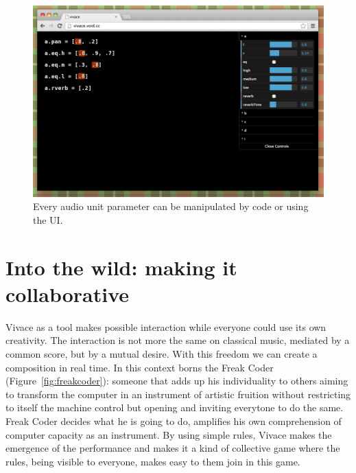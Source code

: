 \documentclass[letterpaper, 12pt]{article}
\begin{document}
\begin{figure}[htpb]
  \begin{center}
    \includegraphics[scale=.3]{img/fig_ui.png}
    \caption{Every audio unit parameter can be manipulated by code or
      using the UI.}
    \label{fig:ui}
  \end{center}
\end{figure}

\section{Into the wild: making it collaborative}
\label{freakcoding}

Vivace as a tool makes possible interaction while everyone could use
its own creativity. The interaction is not more the same on classical
music, mediated by a common score, but by a mutual desire. With this
freedom we can create a composition in real time. In this context
borns the Freak Coder (Figure~\ref{fig:freakcoder}): someone that adds
up his individuality to others aiming to transform the computer in an
instrument of artistic fruition without restricting to itself the
machine control but opening and inviting everytone to do the
same. Freak Coder decides what he is going to do, amplifies his own
comprehension of computer capacity as an instrument. By using simple
rules, Vivace makes the emergence of the performance and makes it a
kind of collective game where the rules, being visible to everyone,
makes easy to them join in this game.
\end{document}
